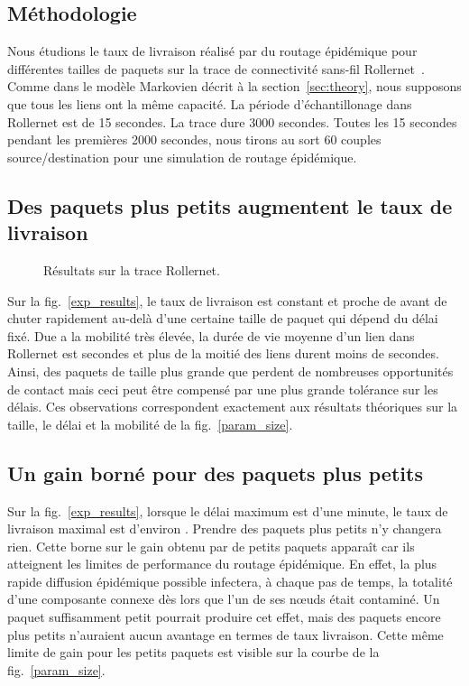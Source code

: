 \documentclass{article-cfip}
\begin{document}
{\subsection{Méthodologie}

Nous étudions le taux de livraison réalisé par du routage épidémique
pour différentes tailles de paquets sur la trace de connectivité
sans-fil Rollernet~\cite{tournoux08_rollernet}.
Comme dans le modèle Markovien décrit à la section~\ref{sec:theory},
nous supposons que tous les liens ont la même capacité. La période
d'échantillonage dans Rollernet est de 15 secondes. La trace dure 3000
secondes. Toutes les 15 secondes pendant les premières 2000 secondes,
nous tirons au sort 60 couples source/destination pour une simulation
de routage épidémique.

\subsection{Des paquets plus petits augmentent le taux de livraison}

\begin{figure}[t]
  \centering
   \qquad
  \caption{Résultats sur la trace Rollernet.}
  \label{exp}
\end{figure}

Sur la fig.~\ref{exp_results}, le taux de livraison est constant et
proche de  avant de chuter rapidement au-delà d'une certaine taille
de paquet qui dépend du délai fixé. Due a la mobilité très
élevée, la durée de vie moyenne d'un lien dans Rollernet est 
secondes et plus de la moitié des liens durent moins de 
secondes. Ainsi, des paquets de taille plus grande que  perdent de
nombreuses opportunités de contact mais ceci peut être compensé par
une plus grande tolérance sur les délais. Ces observations
correspondent exactement aux résultats théoriques sur la taille, le
délai et la mobilité de la fig.~\ref{param_size}.


\subsection{Un gain borné pour des paquets plus petits}

Sur la fig.~\ref{exp_results}, lorsque le délai maximum est d'une
minute, le taux de livraison maximal est d'environ . Prendre des
paquets plus petits n'y changera rien. Cette borne sur le gain obtenu
par de petits paquets apparaît car ils atteignent les limites de
performance du routage épidémique. En effet, la plus rapide diffusion
épidémique possible infectera, à chaque pas de temps, la totalité
d'une composante connexe dès lors que l'un de ses n{\oe}uds était
contaminé. Un paquet suffisamment petit pourrait produire cet effet,
mais des paquets encore plus petits n'auraient aucun avantage en
termes de taux livraison. Cette même limite de gain pour les petits
paquets est visible sur la courbe  de la fig.~\ref{param_size}.

}
\end{document}
